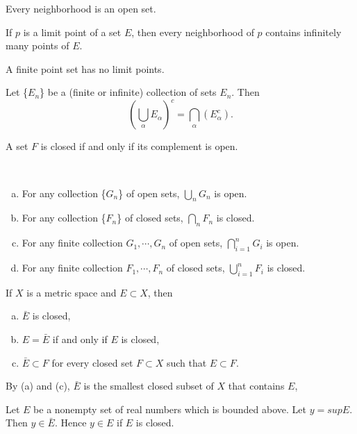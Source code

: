 \begin{thm}
	Every neighborhood is an open set.
\end{thm}

\begin{thm}
	If $p$ is a limit point of a set $E$, then every neighborhood of $p$ contains infinitely many points of $E$.
\end{thm}

\begin{cor}
	A finite point set has no limit points.
\end{cor}

\begin{thm}
	Let \{$E_n$\} be a (finite or infinite) collection of sets $E_n$. Then $$\left(\bigcup _\alpha E_\alpha\right)^c = \bigcap_\alpha \left(E_\alpha^c\right).$$
\end{thm}

\begin{thm}
	A set $F$ is closed if and only if its complement is open.
\end{thm}
\begin{thm}
	~
	\begin{enumerate}[(a)]
	\item For any collection \{$G_n$\} of open sets, $\bigcup_n G_n$ is open.
	\item For any collection \{$F_n$\} of closed sets, $\bigcap_n F_n$ is closed.
	\item For any finite collection $G_1, \cdots, G_n$ of open sets, $\bigcap_{i=1}^n G_i $ is open.
	\item For any finite collection $F_1, \cdots, F_n$ of closed sets, $\bigcup_{i=1}^n F_i $ is closed.
	\end{enumerate}
\end{thm}

\begin{thm}
	If $X$ is a metric space and $E\subset X$, then
	\begin{enumerate}[(a)]
	\item $\bar E$ is closed,
	\item $E=\bar E$ if and only if $E$ is closed,
	\item $\bar E \subset F$ for every closed set $F\subset X$ such that $E \subset F$.
	\end{enumerate}
	By (a) and (c), $\bar E$ is the smallest closed subset of $X$ that contains $E$,
\end{thm}

\begin{thm}
	Let $E$ be a nonempty set of real numbers which is bounded above. Let $y = sup E$. Then $y \in \bar E$. Hence $y \in E$ if $E$ is closed.
\end{thm}

